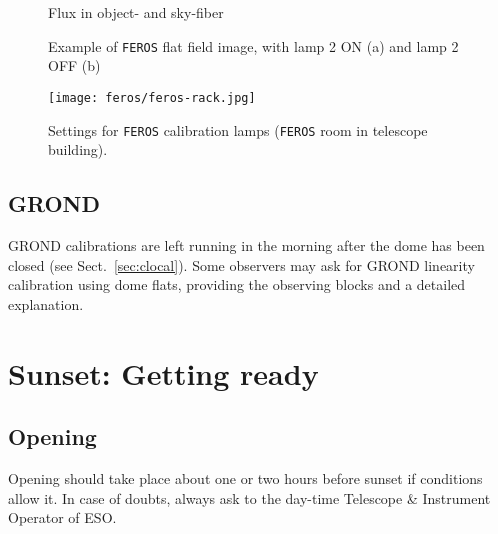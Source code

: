 \documentclass[11pt,fleqn,a4paper]{book}
\begin{document}
\begin{figure*}
\hfill
{}
\caption{Flux in object- and sky-fiber}
\label{fig:feros-flux}
\end{figure*}


\begin{figure*}
\hfill
{}
\caption{Example of \texttt{FEROS} flat field image, with lamp 2 ON (a) and lamp 2 OFF (b)}
\label{fig:feros-ff}
\end{figure*}


\begin{figure*}
\centering
\texttt{[image: feros/feros-rack.jpg]}
\caption{Settings for \texttt{FEROS} calibration lamps (\texttt{FEROS} room in telescope building). }
\label{fig:feros-rack}
\end{figure*}

\newpage	
\section{GROND}

GROND calibrations are left running in the morning after the \gls{dome} has been closed (see Sect.~\ref{sec:clocal}). Some observers may ask for GROND linearity calibration using \gls{dome flats}, providing the observing blocks and a detailed explanation.



\chapter{Sunset: Getting ready}
\label{chap:sunset}

\section{Opening}
\label{sec:open}

Opening should take place about one or two hours before sunset if conditions allow it. In case of doubts, always ask to the day-time Telescope \& Instrument Operator of ESO.
\end{document}
